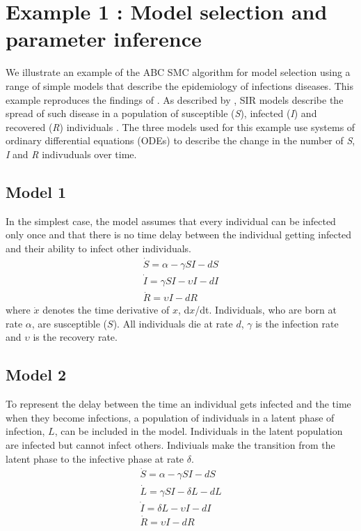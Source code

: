 \documentclass[a4paper]{report}
\begin{document}
\section{Example 1 : Model selection and parameter inference}
We illustrate an example of the ABC SMC algorithm for model selection using a range of simple models that describe the epidemiology of infections diseases. This example reproduces the findings of \cite{Toni2009}. As described by \citeauthor{Toni2009}, SIR models describe the spread of such disease in a population of susceptible (\emph{S}), infected (\emph{I}) and recovered (\emph{R}) individuals \citep{Anderson1991}. The three models used for this example use systems of ordinary differential equations (ODEs) to describe the change in the number of \emph{S}, \emph{I} and \emph{R} indivuduals over time.

\subsection*{Model 1}
In the simplest case, the model assumes that every individual can be infected only once and that there is no time delay between the individual getting infected and their ability to infect other individuals.
\begin{gather*}
\dot S = \alpha - \gamma SI - dS \\
\dot I = \gamma SI - \upsilon I - dI \\
\dot R = \upsilon I - dR
\end{gather*}
where $\dot x$ denotes the time derivative of $x$, d$x$/dt. Individuals, who are born at rate $\alpha$, are susceptible ($S$). All individuals die at rate $d$, $\gamma$ is the infection rate and $\upsilon$ is the recovery rate.

\subsection*{Model 2}
To represent the delay between the time an individual gets infected and the time when they become infections, a population of individuals in a latent phase of infection, $L$, can be included in the model. Individuals in the latent population are infected but cannot infect others. Indiviuals make the transition from the latent phase to the infective phase at rate $\delta$.
\begin{gather*}
\dot S = \alpha - \gamma SI - dS \\
\dot L = \gamma SI - \delta L - dL \\
\dot I = \delta L - \upsilon I - dI \\
\dot R = \upsilon I - dR
\end{gather*}
\end{document}

